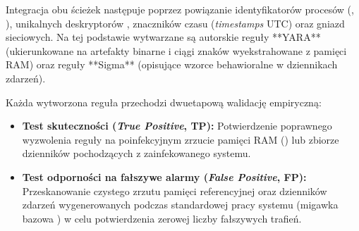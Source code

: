 Integracja obu ścieżek następuje poprzez powiązanie identyfikatorów procesów (, ), unikalnych deskryptorów , znaczników czasu (\textit{timestamps} UTC) oraz gniazd sieciowych. Na tej podstawie wytwarzane są autorskie reguły **YARA** (ukierunkowane na artefakty binarne i ciągi znaków wyekstrahowane z pamięci RAM) oraz reguły **Sigma** (opisujące wzorce behawioralne w dziennikach zdarzeń).

Każda wytworzona reguła przechodzi dwuetapową walidację empiryczną:
\begin{itemize}
    \item \textbf{Test skuteczności (\textit{True Positive}, TP):} Potwierdzenie poprawnego wyzwolenia reguły na poinfekcyjnym zrzucie pamięci RAM () lub zbiorze dzienników  pochodzących z zainfekowanego systemu.
    \item \textbf{Test odporności na fałszywe alarmy (\textit{False Positive}, FP):} Przeskanowanie czystego zrzutu pamięci referencyjnej oraz dzienników zdarzeń wygenerowanych podczas standardowej pracy systemu (migawka bazowa ) w celu potwierdzenia zerowej liczby fałszywych trafień.
\end{itemize}

